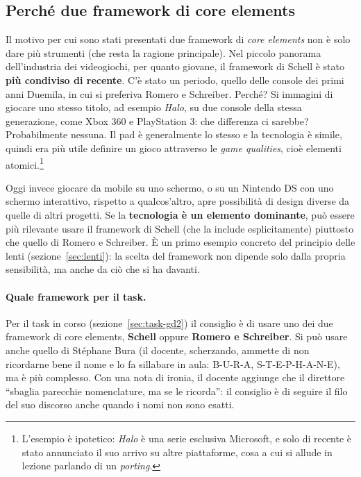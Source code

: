 \subsection{Perché due framework di core elements}

Il motivo per cui sono stati presentati due framework di \emph{core elements}
non è solo dare più strumenti (che resta la ragione principale). Nel piccolo
panorama dell'industria dei videogiochi, per quanto giovane, il framework di
Schell è stato \textbf{più condiviso di recente}. C'è stato un periodo, quello
delle console dei primi anni Duemila, in cui si preferiva Romero e Schreiber.
Perché? Si immagini di giocare uno stesso titolo, ad esempio \emph{Halo}, su
due console della stessa generazione, come Xbox 360 e PlayStation 3: che
differenza ci sarebbe? Probabilmente nessuna. Il pad è generalmente lo stesso
e la tecnologia è simile, quindi era più utile definire un gioco attraverso le
\emph{game qualities}, cioè elementi atomici.\footnote{L'esempio è ipotetico:
\emph{Halo} è una serie esclusiva Microsoft, e solo di recente è stato
annunciato il suo arrivo su altre piattaforme, cosa a cui si allude in
lezione parlando di un \emph{porting}.}

Oggi invece giocare da mobile su uno schermo, o su un Nintendo DS con uno
schermo interattivo, rispetto a qualcos'altro, apre possibilità di design
diverse da quelle di altri progetti. Se la \textbf{tecnologia è un elemento
dominante}, può essere più rilevante usare il framework di Schell (che la
include esplicitamente) piuttosto che quello di Romero e Schreiber. È un primo
esempio concreto del principio delle lenti (sezione~\ref{sec:lenti}): la
scelta del framework non dipende solo dalla propria sensibilità, ma anche da
ciò che si ha davanti.

\paragraph{Quale framework per il task.} Per il task in corso
(sezione~\ref{sec:task-gd2}) il consiglio è di usare uno dei due framework di
core elements, \textbf{Schell} oppure \textbf{Romero e Schreiber}. Si può
usare anche quello di Stéphane Bura (il docente, scherzando, ammette di non
ricordarne bene il nome e lo fa sillabare in aula: B-U-R-A, S-T-E-P-H-A-N-E),
ma è più complesso. Con una nota di ironia, il docente aggiunge che il
direttore ``sbaglia parecchie nomenclature, ma se le ricorda'': il consiglio
è di seguire il filo del suo discorso anche quando i nomi non sono esatti.

